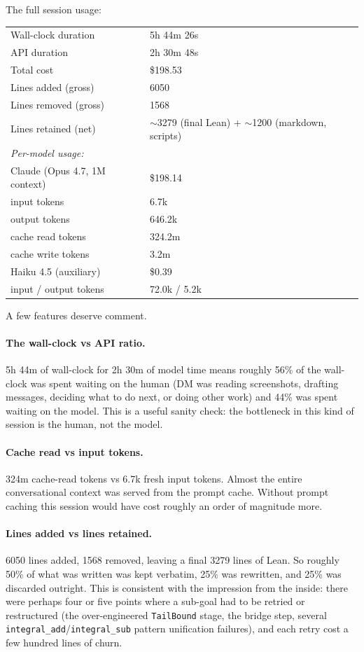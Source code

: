 \documentclass[11pt]{article}
\begin{document}
The full session usage:

\begin{center}
\begin{tabular}{ll}
\hline
Wall-clock duration & 5h 44m 26s \\
API duration & 2h 30m 48s \\
Total cost & \$198.53 \\
Lines added (gross) & 6050 \\
Lines removed (gross) & 1568 \\
Lines retained (net) & $\sim$3279 (final Lean) + $\sim$1200 (markdown, scripts) \\
\hline
\multicolumn{2}{l}{\emph{Per-model usage:}} \\
\hline
Claude (Opus 4.7, 1M context) & \$198.14 \\
\quad input tokens & 6.7k \\
\quad output tokens & 646.2k \\
\quad cache read tokens & 324.2m \\
\quad cache write tokens & 3.2m \\
Haiku 4.5 (auxiliary) & \$0.39 \\
\quad input / output tokens & 72.0k / 5.2k \\
\hline
\end{tabular}
\end{center}

A few features deserve comment.

\paragraph{The wall-clock vs API ratio.} 5h 44m of wall-clock for 2h 30m
of model time means roughly 56\% of the wall-clock was spent waiting on
the human (DM was reading screenshots, drafting messages, deciding what
to do next, or doing other work) and 44\% was spent waiting on the
model. This is a useful sanity check: the bottleneck in this kind of
session is the human, not the model.

\paragraph{Cache read vs input tokens.} 324m cache-read tokens vs 6.7k
fresh input tokens. Almost the entire conversational context was served
from the prompt cache. Without prompt caching this session would have
cost roughly an order of magnitude more.

\paragraph{Lines added vs lines retained.} 6050 lines added, 1568
removed, leaving a final 3279 lines of Lean. So roughly 50\% of what was
written was kept verbatim, 25\% was rewritten, and 25\% was discarded
outright. This is consistent with the impression from the inside: there
were perhaps four or five points where a sub-goal had to be retried or
restructured (the over-engineered \texttt{TailBound} stage, the bridge
step, several \texttt{integral\_add}/\texttt{integral\_sub} pattern
unification failures), and each retry cost a few hundred lines of churn.
\end{document}

